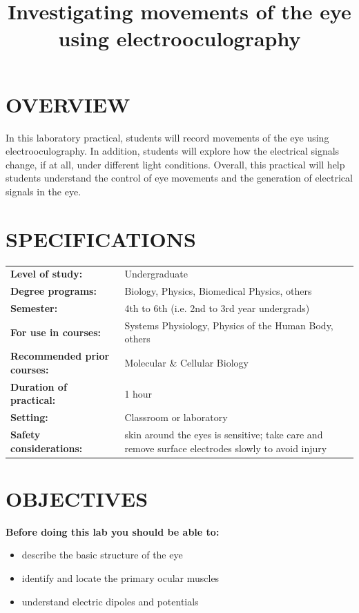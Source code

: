\documentclass[12pt]{article}
\title{\vspace{-1.8cm}\Large{\textbf{Investigating movements of the eye using electrooculography}}}
\author{}
\date{}
\begin{document}
\maketitle

\vspace{-1.4cm}

\section*{OVERVIEW}

In this laboratory practical, students will record movements of the eye using electrooculography. In addition, students will explore how the electrical signals change, if at all, under different light conditions. Overall, this practical will help students understand the control of eye movements and the generation of electrical signals in the eye.

\section*{SPECIFICATIONS}
\begin{tabular}{p{6cm} p{10cm}}
\textbf{Level of study:} & Undergraduate \\
\textbf{Degree programs:} & Biology, Physics, Biomedical Physics, others \\
\textbf{Semester:} & 4th to 6th (i.e. 2nd to 3rd year undergrads) \\ 
\textbf{For use in courses:} & Systems Physiology, Physics of the Human Body, others \\
\textbf{Recommended prior courses:} & Molecular \& Cellular Biology \\
\textbf{Duration of practical:} & 1 hour \\
\textbf{Setting:} & Classroom or laboratory \\
\textbf{Safety considerations:} & skin around the eyes is sensitive; take care and remove surface electrodes slowly to avoid injury \\
\end{tabular}

\section*{OBJECTIVES}
\textbf{Before doing this lab you should be able to:}
\begin{itemize}
\item describe the basic structure of the eye
\item identify and locate the primary ocular muscles
\item understand electric dipoles and potentials 
\end{itemize}
 
\end{document}
